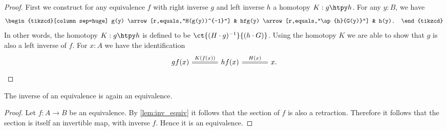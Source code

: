 \begin{proof}
First we construct for any equivalence $f$ with right inverse $g$ and left inverse $h$ a homotopy $K:g\htpy h$. For any $y:B$, we have 
\begin{equation*}
\begin{tikzcd}[column sep=huge]
g(y) \arrow[r,equals,"H(g(y))^{-1}"] & hfg(y) \arrow[r,equals,"\ap{h}{G(y)}"] & h(y).
\end{tikzcd}
\end{equation*} 
In other words, the homotopy $K:g\htpy h$ is defined to be $\ct{(H\cdot g)^{-1}}{(h\cdot G)}$.
Using the homotopy $K$ we are able to show that $g$ is also a left inverse of $f$. For $x:A$ we have the identification
\begin{equation*}
\begin{tikzcd}[column sep=large]
gf(x) \arrow[r,equals,"K(f(x))"] & hf(x) \arrow[r,equals,"H(x)"] & x.
\end{tikzcd}\qedhere
\end{equation*}
\end{proof}

\begin{cor}
The inverse of an equivalence is again an equivalence.
\end{cor}

\begin{proof}
Let $f:A\to B$ be an equivalence. By \cref{lem:inv_equiv} it follows that the section of $f$ is also a retraction. Therefore it follows that the section is itself an invertible map, with inverse $f$. Hence it is an equivalence.
\end{proof}

